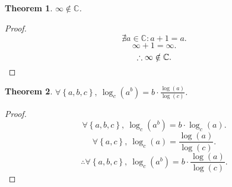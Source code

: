 \documentclass{article}
\begin{document}
\newtheorem{thm}{Theorem}
\begin{thm}
	$\infty \notin \mathbb{C}$.
\end{thm}
\begin{proof}
	\[
		\nexists a \in \mathbb{C} : a + 1 = a.
	\]
	\[
		\infty + 1 = \infty.
	\]
	\[
		\therefore \infty \notin \mathbb{C}.\qedhere
	\]
\end{proof}
\begin{thm}
	$\forall \left\{a,b,c\right\}, \ 
	\log_c\left(a^b\right) = b \cdot \frac{\log(a)}{\log(c)}$.
\end{thm}
\begin{proof}
	\[
		\forall \left\{a,b,c\right\}, \
		\log_c\left(a^b\right) =
		b \cdot \log_c\left(a\right).
	\]
	\[
		\forall \left\{a,c\right\}, \ 
		\log_c\left(a\right) =
		\frac{\log\left(a\right)}{\log\left(c\right)}.
	\]
	\[
		\therefore \forall \left\{a,b,c\right\}, \ 
		\log_c\left(a^b\right) =
		b \cdot \frac{\log(a)}{\log(c)}.
	\]
\end{proof}
\end{document}
